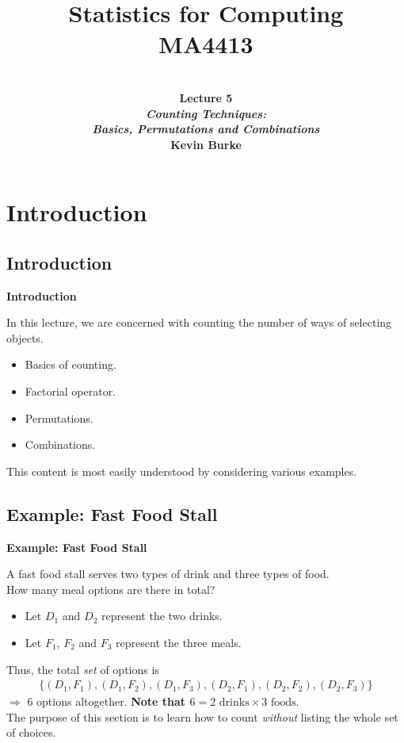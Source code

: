 \documentclass[compress]{beamer}        %
\title{{\huge Statistics for Computing\\[0.1cm]MA4413}}
\author[Kevin Burke]{{\bf\\[0.5cm]{\huge Lecture 5}\\[0.2cm]\emph{Counting Techniques:\\Basics, Permutations and Combinations}\\[1.4cm]Kevin Burke}\\[0.3cm]\tcb{kevin.burke@ul.ie}}
\institute[University of Limerick, Maths \& Stats Dept]{}
\date{}
\makeatletter
\newcommand{\tcb}{\textcolor{beamer@blendedblue}}
\makeatother
\begin{document}
\begin{frame}[t]
\titlepage
\end{frame}

\section{Introduction}
\subsection{Introduction}
\begin{frame}{\bf \tcb{Introduction}}

In this lecture, we are concerned with counting the number of ways of selecting objects.\\[0.4cm]

\begin{itemize}\itemsep0.4cm
\item Basics of counting.
\item Factorial operator.
\item Permutations.
\item Combinations.\\[0.6cm]
\end{itemize}

This content is most easily understood by considering various examples.

\end{frame}

\subsection{Example: Fast Food Stall}
\begin{frame}{\bf \tcb{Example: Fast Food Stall}}

A fast food stall serves two types of drink and three types of food.\\[0.2cm]
How many meal options are there in total?\\[0.2cm]
\begin{itemize}\itemsep0.2cm
\item Let $D_1$ and $D_2$ represent the two drinks.
\item Let $F_1$, $F_2$ and $F_3$ represent the three meals.\\[0.5cm]
\end{itemize}
Thus, the total \emph{set} of options is
\begin{align*}
\{(D_1, F_1), (D_1, F_2), (D_1, F_3), (D_2, F_1), (D_2, F_2), (D_2, F_3)\}
\end{align*}
$\Rightarrow$ 6 options altogether. {\bf Note that {\boldmath$6 = 2\text{ drinks} \times 3 \text{ foods}$}}.\\[0.5cm]

The purpose of this section is to learn how to count \emph{without} listing the whole set of choices.

\end{frame}
\end{document}
